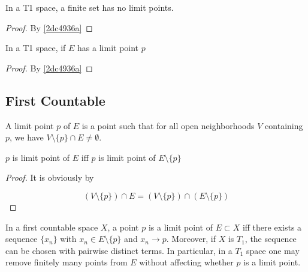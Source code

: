 \begin{corollary}
    In a T1 space, a finite set has no limit points. 
\end{corollary}

\begin{proof}
    By \cref{2dc4936a}
\end{proof}

\begin{corollary}
    In a T1 space, if $E$ has a limit point $p$
\end{corollary}

\begin{proof}
    By \cref{2dc4936a}
\end{proof}

\subsection{First Countable}

\begin{definition}
   A limit point $p$ of $E$ is a point such that for all open neighborhoods 
   $V$ containing $p$, we have $V \setminus \{ p \} \cap E \ne \emptyset$.
\end{definition}


\begin{corollary}\label{57d9c0d2}
    $p$ is limit point of $E$ iff $p$ is  limit point of $E \setminus \{ p \}$
\end{corollary}

\begin{proof}
    It is obviously by 

    \[
        \left(V \setminus \{ p \} \right) \cap E = \left(V \setminus \{ p \} \right) \cap \left( E \setminus \{ p \} \right)
    \]
\end{proof}

\begin{thm}
    In a first countable space $X$, a point $p$ is a limit point of $E\subset X$ iff 
    there exists a sequence $\{ x_n \}$ with $x_n\in E\setminus\{p\}$ and $x_n\to p$. Moreover, if $X$ is $T_1$, the sequence can be chosen with pairwise distinct terms. In particular, in a $T_1$ space one may remove finitely many points from $E$ without affecting whether $p$ is a limit point.
\end{thm}

